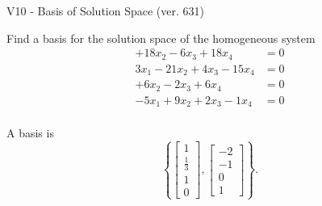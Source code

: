 \begin{exercise}
  \begin{exerciseTitle}V10 - Basis of Solution Space (ver. 631)\end{exerciseTitle}
  \begin{exerciseStatement}
    Find a basis for the solution space of the homogeneous system 
\begin{align*}
 + 18 x_ 2 -6 x_ 3 + 18 x_ 4 &= 0  \\ 
  3 x_ 1 -21 x_ 2 + 4 x_ 3 -15 x_ 4 &= 0  \\ 
  + 6 x_ 2 -2 x_ 3 + 6 x_ 4 &= 0  \\ 
  -5 x_ 1 + 9 x_ 2 + 2 x_ 3 -1 x_ 4 &= 0  \\ 
 \end{align*}


 
  \end{exerciseStatement}

  \begin{exerciseAnswer}
   A basis is   
\[\left\{\left[\begin{array}{c}
1 \\
\frac{1}{3} \\
1 \\
0
\end{array}\right] , \left[\begin{array}{c}
-2 \\
-1 \\
0 \\
1
\end{array}\right]\right\}.\]

  


  \end{exerciseAnswer}
\end{exercise}